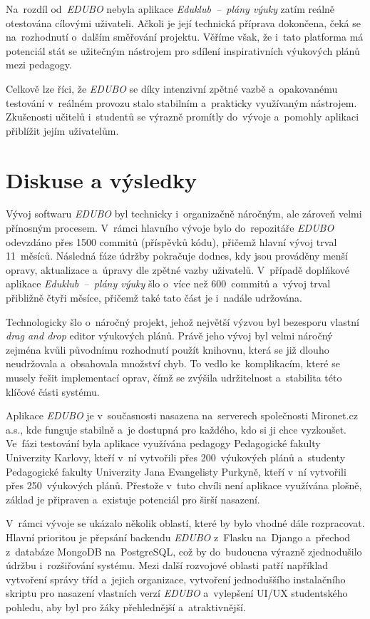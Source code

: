 \documentclass[male,czech,api_bc]{kitheses}
\begin{document}
Na~rozdíl od~\textit{EDUBO} nebyla aplikace \textit{Eduklub~--~plány výuky} zatím reálně otestována cílovými uživateli. Ačkoli je její technická příprava dokončena, čeká se na~rozhodnutí o~dalším směřování projektu. Věříme však, že i~tato platforma má potenciál stát se užitečným nástrojem pro sdílení inspirativních výukových plánů mezi pedagogy.

Celkově lze říci, že \textit{EDUBO} se díky intenzivní zpětné vazbě a~opakovanému testování v~reálném provozu stalo stabilním a~prakticky využívaným nástrojem. Zkušenosti učitelů i~studentů se výrazně promítly do~vývoje a~pomohly aplikaci přiblížit jejím uživatelům.


\chapter{Diskuse a výsledky}

Vývoj softwaru \textit{EDUBO} byl technicky i~organizačně náročným, ale zároveň velmi přínosným procesem. V~rámci hlavního vývoje bylo do~repozitáře \textit{EDUBO} odevzdáno přes 1500 commitů (příspěvků kódu), přičemž hlavní vývoj trval 11~měsíců. Následná fáze údržby pokračuje dodnes, kdy jsou prováděny menší opravy, aktualizace a~úpravy dle zpětné vazby uživatelů. V~případě doplňkové aplikace \textit{Eduklub~--~plány výuky} šlo o~více než 600~commitů a~vývoj trval přibližně čtyři měsíce, přičemž také tato část je i~nadále udržována.

Technologicky šlo o~náročný projekt, jehož největší výzvou byl bezesporu vlastní \textit{drag and drop} editor výukových plánů. Právě jeho vývoj byl velmi náročný zejména kvůli původnímu rozhodnutí použít knihovnu, která se již dlouho neudržovala a~obsahovala množství chyb. To vedlo ke~komplikacím, které se musely řešit implementací oprav, čímž se zvýšila udržitelnost a~stabilita této klíčové části systému.

Aplikace \textit{EDUBO} je v~současnosti nasazena na~serverech společnosti Mironet.cz a.s., kde funguje stabilně a~je dostupná pro každého, kdo si ji chce vyzkoušet. Ve~fázi testování byla aplikace využívána pedagogy Pedagogické fakulty Univerzity Karlovy, kteří v~ní vytvořili přes 200~výukových plánů a~studenty Pedagogické fakulty Univerzity Jana Evangelisty Purkyně, kteří v~ní vytvořili přes 250~výukových plánů. Přestože v~tuto chvíli není aplikace využívána plošně, základ je připraven a~existuje potenciál pro širší nasazení.

V~rámci vývoje se ukázalo několik oblastí, které by bylo vhodné dále rozpracovat. Hlavní prioritou je přepsání backendu \textit{EDUBO} z~Flasku na~Django a~přechod z~databáze MongoDB na~PostgreSQL, což by do~budoucna výrazně zjednodušilo údržbu i~rozšiřování systému. Mezi další rozvojové oblasti patří například vytvoření správy tříd a~jejich organizace, vytvoření jednoduššího instalačního skriptu pro nasazení vlastních verzí \textit{EDUBO} a~vylepšení UI/UX studentského pohledu, aby byl pro žáky přehlednější a~atraktivnější.
\end{document}
